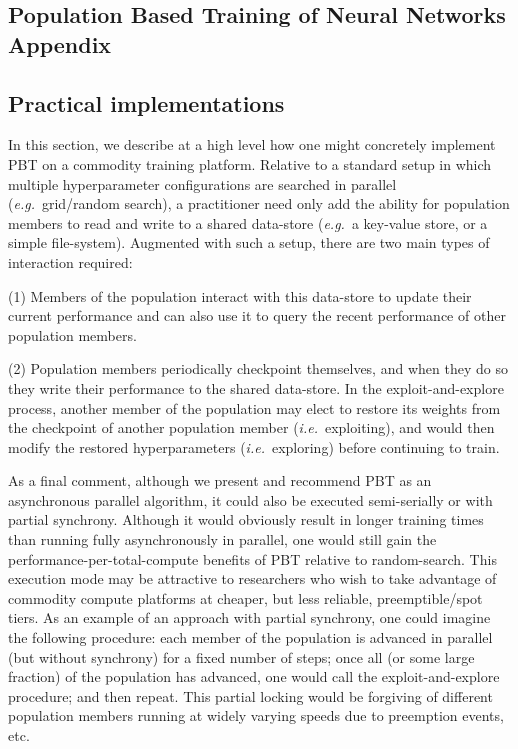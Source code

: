 \documentclass{article} %
\def\eg{\emph{e.g.}}
\def\ie{\emph{i.e.}}
\begin{document}




\begin{appendices}




\newpage
\section{Population Based Training of Neural Networks Appendix}\label{sec:appendix}

\subsection{Practical implementations}\label{sec:practicum}

In this section, we describe at a high level how one might concretely implement PBT on a commodity training platform.
%
Relative to a standard setup in which multiple hyperparameter configurations are searched in parallel
(\eg~grid/random search), a practitioner need only add the ability for population members to read and write to a shared data-store (\eg~a key-value store, or a simple file-system). Augmented with such a setup, there are two main types of interaction required: 


(1)  Members of the population interact with this data-store to update their current performance and can also use it to query the recent performance of other population members.

(2)  Population members periodically checkpoint themselves, and when they do so they write their performance to the shared data-store. In the exploit-and-explore process, another member of the population may elect to restore its weights from the checkpoint of another population member (\ie~exploiting), and would then modify the restored hyperparameters (\ie~exploring) before continuing to train.

As a final comment, although we present and recommend PBT as an asynchronous parallel algorithm, it could also be executed  semi-serially or with partial synchrony. 
%
Although it would obviously result in longer training times than running fully asynchronously in parallel, one would still gain the performance-per-total-compute benefits of PBT relative to random-search. This execution mode may be attractive to researchers who wish to take advantage of commodity compute platforms at cheaper, but less reliable, preemptible/spot tiers.
%
As an example of an approach with partial synchrony, one could imagine the following procedure: each member of the population is advanced in parallel (but without synchrony) for a fixed number of steps;  once all (or some large fraction) of the population has advanced, one would call the exploit-and-explore procedure; and then repeat. This partial locking would be forgiving of different population members running at widely varying speeds due to preemption events, etc.


\end{appendices}
\end{document}
